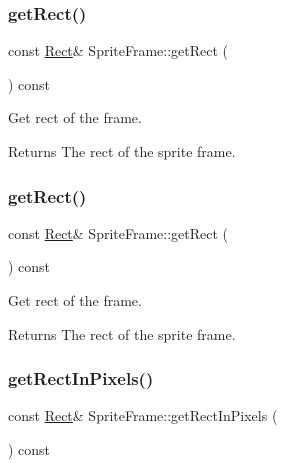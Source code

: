 \subsubsection{\texorpdfstring{get\+Rect()}{getRect()}\hspace{0.1cm}{\footnotesize\ttfamily [1/2]}}
{\footnotesize\ttfamily const \hyperlink{classRect}{Rect}\& Sprite\+Frame\+::get\+Rect (\begin{DoxyParamCaption}{ }\end{DoxyParamCaption}) const\hspace{0.3cm}{\ttfamily [inline]}}

Get rect of the frame.

\begin{DoxyReturn}{Returns}
The rect of the sprite frame. 
\end{DoxyReturn}
\mbox{\label{classSpriteFrame_a7caab90d4ee888a3260f36c52146ca6d}} 
\subsubsection{\texorpdfstring{get\+Rect()}{getRect()}\hspace{0.1cm}{\footnotesize\ttfamily [2/2]}}
{\footnotesize\ttfamily const \hyperlink{classRect}{Rect}\& Sprite\+Frame\+::get\+Rect (\begin{DoxyParamCaption}{ }\end{DoxyParamCaption}) const\hspace{0.3cm}{\ttfamily [inline]}}

Get rect of the frame.

\begin{DoxyReturn}{Returns}
The rect of the sprite frame. 
\end{DoxyReturn}
\mbox{\label{classSpriteFrame_a4fe04d5adcc732b7f8f772f3020a2af5}} 
\subsubsection{\texorpdfstring{get\+Rect\+In\+Pixels()}{getRectInPixels()}\hspace{0.1cm}{\footnotesize\ttfamily [1/2]}}
{\footnotesize\ttfamily const \hyperlink{classRect}{Rect}\& Sprite\+Frame\+::get\+Rect\+In\+Pixels (\begin{DoxyParamCaption}{ }\end{DoxyParamCaption}) const\hspace{0.3cm}{\ttfamily [inline]}}

